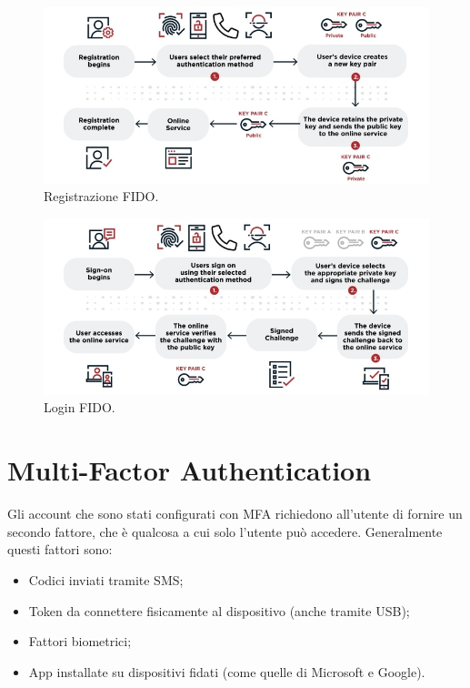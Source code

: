\begin{figure}
    \centering
    \includegraphics[width=1\textwidth]{images/7-3.jpg}
    \caption{Registrazione FIDO.}
    \label{fig:7-3}
\end{figure}

\begin{figure}
    \centering
    \includegraphics[width=1\textwidth]{images/7-4.jpg}
    \caption{Login FIDO.}
    \label{fig:7-4}
\end{figure}

\section{Multi-Factor Authentication}
Gli account che sono stati configurati con MFA richiedono all'utente di fornire un secondo fattore, che è qualcosa a cui solo l'utente può accedere. Generalmente questi fattori sono:
\begin{itemize}
    \item Codici inviati tramite SMS;
    \item Token da connettere fisicamente al dispositivo (anche tramite USB);
    \item Fattori biometrici;
    \item App installate su dispositivi fidati (come quelle di Microsoft e Google).
\end{itemize}

